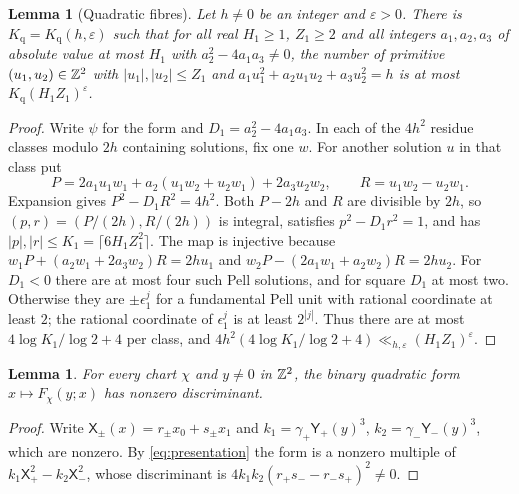 \documentclass[11pt,reqno]{amsart}
\newtheorem{lemma}[theorem]{Lemma}
\theoremstyle{definition}
\theoremstyle{remark}
\numberwithin{equation}{section}
\newcommand{\eps}{\varepsilon}\newcommand{\card}{\#}
\begin{document}
\begin{lemma}[Quadratic fibres]\label{lem:quadfibre}
Let $h\ne0$ be an integer and $\eps>0$. There is $K_{\mathrm q}=K_{\mathrm q}(h,\eps)$ such that for
all real $H_1\ge1$, $Z_1\ge2$ and all integers $a_1,a_2,a_3$ of absolute
value at most $H_1$ with $a_2^2-4a_1a_3\ne0$, the number of primitive
$(u_1,u_2)\in\mathbb Z^2$ with $|u_1|,|u_2|\le Z_1$ and
$a_1u_1^2+a_2u_1u_2+a_3u_2^2=h$ is at most $K_{\mathrm q}(H_1Z_1)^{\eps}$.
\end{lemma}
\begin{proof}
Write $\psi$ for the form and $D_1=a_2^2-4a_1a_3$. In each of the
$4h^2$ residue classes modulo $2h$ containing solutions, fix one $w$.
For another solution $u$ in that class put
\[
 P=2a_1u_1w_1+a_2(u_1w_2+u_2w_1)+2a_3u_2w_2,
 \qquad R=u_1w_2-u_2w_1.
\]
Expansion gives $P^2-D_1R^2=4h^2$. Both $P-2h$ and $R$ are divisible
by $2h$, so $(p,r)=(P/(2h),R/(2h))$ is integral, satisfies
$p^2-D_1r^2=1$, and has $|p|,|r|\le K_1=\lceil6H_1Z_1^2\rceil$.
The map is injective because
$w_1P+(a_2w_1+2a_3w_2)R=2hu_1$ and
$w_2P-(2a_1w_1+a_2w_2)R=2hu_2$.
For $D_1<0$ there are at most four such Pell solutions, and for square
$D_1$ at most two. Otherwise they are $\pm\epsilon_1^j$ for a
fundamental Pell unit with rational coordinate at least $2$;
the rational coordinate of $\epsilon_1^j$ is at least $2^{|j|}$.
Thus there are at most $4\log K_1/\log2+4$ per class, and
$4h^2(4\log K_1/\log2+4)\ll_{h,\eps}(H_1Z_1)^\eps$.
\end{proof}

\begin{lemma}\label{lem:quaddisc}
For every chart $\chi$ and $y\ne0$ in $\mathbb Z^2$, the binary quadratic form
$x\mapsto F_\chi(y;x)$ has nonzero discriminant.
\end{lemma}
\begin{proof}
Write $\mathsf X_\pm(x)=r_\pm x_0+s_\pm x_1$ and $k_1=\gamma_+\mathsf Y_+(y)^3$,
$k_2=\gamma_-\mathsf Y_-(y)^3$, which are nonzero. By \eqref{eq:presentation} the
form is a nonzero multiple of $k_1\mathsf X_+^2-k_2\mathsf X_-^2$, whose discriminant is
$4k_1k_2(r_+s_--r_-s_+)^2\ne0$.
\end{proof}
\end{document}
